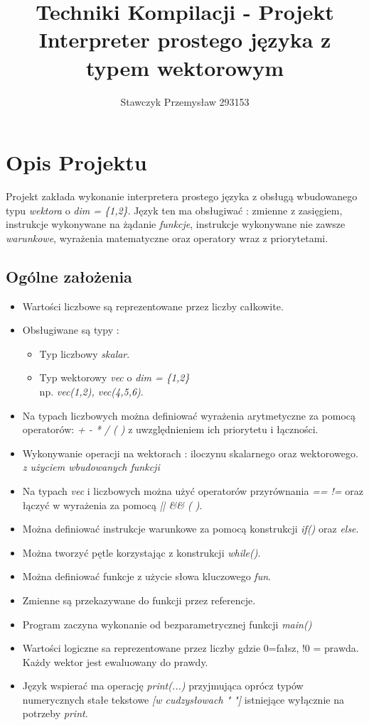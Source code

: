 \documentclass[11pt]{article} %
\title{%
	Techniki Kompilacji - Projekt \\
	\large Interpreter prostego języka z typem wektorowym
	}
\author{Stawczyk Przemysław 293153}
\date{} %
\begin{document}
\maketitle



\section{Opis Projektu}
Projekt zakłada wykonanie interpretera prostego języka z obsługą wbudowanego typu \textsl{wektora} o \textsl{dim = \{1,2\}}. Język ten ma obsługiwać : zmienne z zasięgiem, instrukcje wykonywane na żądanie \textsl{funkcje}, instrukcje wykonywane nie zawsze \textsl{warunkowe}, wyrażenia matematyczne oraz operatory wraz z priorytetami.
\subsection{Ogólne założenia}
\begin{itemize}
	\item 
		Wartości liczbowe są reprezentowane przez liczby całkowite.
	\item
		Obsługiwane są typy : 
		\begin{itemize}
			\item 
				Typ liczbowy \textsl{skalar}.
			\item
				Typ wektorowy \textsl{vec} o \textsl{dim = \{1,2\}}\\ np. \textsl{vec(1,2), vec(4,5,6)}.
		\end{itemize}
	\item
		Na typach liczbowych można definiować wyrażenia arytmetyczne za pomocą operatorów: \textsl{+ - * / ( )} z uwzględnieniem ich priorytetu i łączności.
	\item
		Wykonywanie operacji na wektorach : iloczynu skalarnego oraz wektorowego. \textsl{z użyciem wbudowanych funkcji}
	\item
		Na typach \textsl{vec} i liczbowych można użyć operatorów przyrównania \textsl{== !=} oraz łączyć w wyrażenia za pomocą \textsl{|| \&\& ( )}.
	\item 
		Można definiować instrukcje warunkowe za pomocą konstrukcji \textsl{if()} oraz \textsl{else}.
	\item
		Można tworzyć pętle korzystając z konstrukcji \textsl{while()}.
	\item
		Można definiować funkcje z użycie słowa kluczowego \textsl{fun}.
	\item
		Zmienne są przekazywane do funkcji przez referencje.
	\item
		Program zaczyna wykonanie od bezparametrycznej funkcji \textsl{main()}
	\item 
		Wartości logiczne sa reprezentowane przez liczby gdzie 0=fałsz, !0 = prawda. Każdy wektor jest ewaluowany do prawdy.
	\item
		Język wspierać ma operację \textsl{print(...)} przyjmująca oprócz typów numerycznych stałe tekstowe \textsl{[w cudzysłowach " "]} istniejące wyłącznie na potrzeby \textsl{print}.
\end{itemize}
\end{document}
